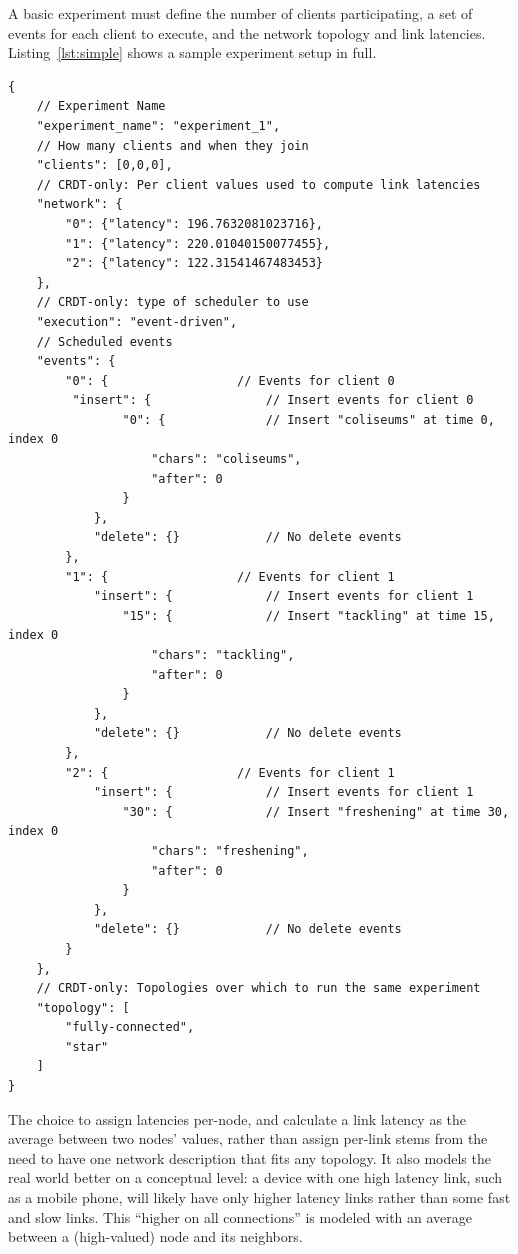 \documentclass[12pt,a4paper,twoside,openright]{report}
\begin{document}
	A basic experiment must define the number of clients participating, a set of events for each client to execute, and the network topology and link latencies. Listing~\ref{lst:simple} shows a sample experiment setup in full.
	

\begin{lstlisting}[caption={A simple JSON experiment setup. Comments added for explanation and not part of JSON syntax}, label={lst:simple}]
{
	// Experiment Name
    "experiment_name": "experiment_1", 	
	// How many clients and when they join
    "clients": [0,0,0],		
	// CRDT-only: Per client values used to compute link latencies	
    "network": {				
        "0": {"latency": 196.7632081023716}, 
        "1": {"latency": 220.01040150077455}, 
        "2": {"latency": 122.31541467483453}
    },
	// CRDT-only: type of scheduler to use
    "execution": "event-driven", 	
	// Scheduled events
    "events": {						
        "0": {					// Events for client 0
         "insert": {				// Insert events for client 0
                "0": {				// Insert "coliseums" at time 0, index 0
                    "chars": "coliseums", 
                    "after": 0
                }
            }, 
            "delete": {}			// No delete events
        }, 
        "1": {					// Events for client 1
            "insert": {				// Insert events for client 1
                "15": {				// Insert "tackling" at time 15, index 0
                    "chars": "tackling", 		
                    "after": 0
                }
            }, 
            "delete": {}			// No delete events
        }, 
        "2": {					// Events for client 1
            "insert": {				// Insert events for client 1
                "30": {				// Insert "freshening" at time 30, index 0
                    "chars": "freshening", 
                    "after": 0
                }
            }, 
            "delete": {}			// No delete events
        }
	},
	// CRDT-only: Topologies over which to run the same experiment
    "topology": [					
        "fully-connected", 
        "star"
    ]
}
\end{lstlisting}

	The choice to assign latencies per-node, and calculate a link latency as the average between two nodes' values, rather than assign per-link stems from the need to have one network description that fits any topology. It also models the real world better on a conceptual level: a device with one high latency link, such as a mobile phone, will likely have only higher latency links rather than some fast and slow links. This ``higher on all connections'' is modeled with an average between a (high-valued) node and its neighbors.
\end{document}

